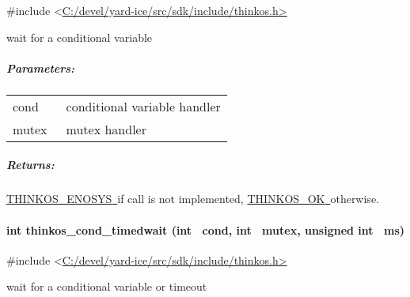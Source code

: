 {{}

{\#include
\textless{}}{\protect\hyperlink{h.pkwqa1}{C:/devel/yard-ice/src/sdk/include/thinkos.h}}{\protect\hyperlink{h.pkwqa1}{\textgreater{}}}

{wait for a conditional variable }

{}

\subparagraph{\texorpdfstring{{Parameters:}}{Parameters:}}\label{parameters-15}

\protect\hypertarget{t.abe173c86a250b55a35b20a1a938b3e0ed603c37}{}{}\protect\hypertarget{t.15}{}{}

\begin{longtable}[]{@{}ll@{}}
\toprule
\begin{minipage}[t]{0.47\columnwidth}\raggedright\strut
{cond}{~}\strut
\end{minipage} & \begin{minipage}[t]{0.47\columnwidth}\raggedright\strut
{conditional variable handler }\strut
\end{minipage}\tabularnewline
\begin{minipage}[t]{0.47\columnwidth}\raggedright\strut
{mutex}{~}\strut
\end{minipage} & \begin{minipage}[t]{0.47\columnwidth}\raggedright\strut
{mutex handler }\strut
\end{minipage}\tabularnewline
\bottomrule
\end{longtable}

\subparagraph{\texorpdfstring{{Returns:}}{Returns:}}\label{returns-19}

{\protect\hyperlink{h.3s49zyc}{THINKOS\_ENOSYS}}{\protect\hyperlink{h.3s49zyc}{~}}{if
call is not implemented,
}{\protect\hyperlink{h.2fk6b3p}{THINKOS\_OK}}{\protect\hyperlink{h.2fk6b3p}{~}}{otherwise.
}

\paragraph{\texorpdfstring{{int thinkos\_cond\_timedwait (int ~cond, int
~mutex, unsigned int
~ms)}}{int thinkos\_cond\_timedwait (int ~cond, int ~mutex, unsigned int ~ms)}}\label{int-thinkos_cond_timedwait-int-cond-int-mutex-unsigned-int-ms}

{}

{\#include
\textless{}}{\protect\hyperlink{h.pkwqa1}{C:/devel/yard-ice/src/sdk/include/thinkos.h}}{\protect\hyperlink{h.pkwqa1}{\textgreater{}}}

{wait for a conditional variable or timeout }

}
